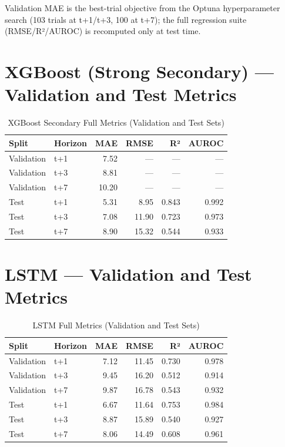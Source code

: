 Validation MAE is the best-trial objective from the Optuna hyperparameter
search (103 trials at t+1/t+3, 100 at t+7); the full regression suite
(RMSE/R²/AUROC) is recomputed only at test time.

\section{XGBoost (Strong Secondary) — Validation and Test Metrics}

\begin{table}[H]
\centering
\caption{XGBoost Secondary Full Metrics (Validation and Test Sets)}
\begin{tabular}{llrrrr}
\toprule
\textbf{Split} & \textbf{Horizon} & \textbf{MAE} & \textbf{RMSE} & \textbf{R²} & \textbf{AUROC} \\
\midrule
Validation & t+1 & 7.52  & ---   & ---   & --- \\
Validation & t+3 & 8.81  & ---   & ---   & --- \\
Validation & t+7 & 10.20 & ---   & ---   & --- \\
\midrule
Test       & t+1 & 5.31  & 8.95  & 0.843 & 0.992 \\
Test       & t+3 & 7.08  & 11.90 & 0.723 & 0.973 \\
Test       & t+7 & 8.90  & 15.32 & 0.544 & 0.933 \\
\bottomrule
\end{tabular}
\end{table}

\section{LSTM — Validation and Test Metrics}

\begin{table}[H]
\centering
\caption{LSTM Full Metrics (Validation and Test Sets)}
\begin{tabular}{llrrrr}
\toprule
\textbf{Split} & \textbf{Horizon} & \textbf{MAE} & \textbf{RMSE} & \textbf{R²} & \textbf{AUROC} \\
\midrule
Validation & t+1 & 7.12  & 11.45 & 0.730 & 0.978 \\
Validation & t+3 & 9.45  & 16.20 & 0.512 & 0.914 \\
Validation & t+7 & 9.87  & 16.78 & 0.543 & 0.932 \\
\midrule
Test       & t+1 & 6.67  & 11.64 & 0.753 & 0.984 \\
Test       & t+3 & 8.87  & 15.89 & 0.540 & 0.927 \\
Test       & t+7 & 8.06  & 14.49 & 0.608 & 0.961 \\
\bottomrule
\end{tabular}
\end{table}

